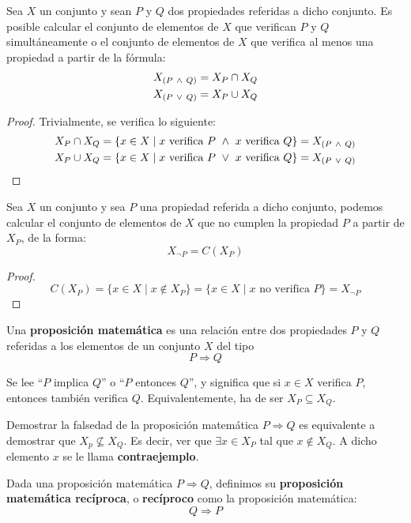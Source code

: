 \begin{prop}
    Sea $X$ un conjunto y sean $P$ y $Q$ dos propiedades referidas a dicho conjunto. Es posible calcular el conjunto de elementos de $X$ que verifican $P$ y $Q$ simultáneamente o el conjunto de elementos de $X$ que verifica al menos una propiedad a partir de la fórmula:
    \begin{gather*}
        X_{(P \ \land \  Q)} = X_P \cap X_Q \\
        X_{(P \ \lor \  Q)} = X_P \cup X_Q
    \end{gather*}
\end{prop}
\begin{proof} Trivialmente, se verifica lo siguiente:
    \begin{gather*}
        X_P \cap X_Q = \{x \in X \mid x \mbox{ verifica } P \ \land \  x \mbox{ verifica } Q\} = X_{(P \ \land \  Q)} \\
        X_P \cup X_Q = \{x \in X \mid x \mbox{ verifica } P \ \lor \  x \mbox{ verifica } Q\} = X_{(P \ \lor \  Q)}
    \end{gather*}
\end{proof}

\begin{prop}
    Sea $X$ un conjunto y sea $P$ una propiedad referida a dicho conjunto, podemos calcular el conjunto de elementos de $X$ que no cumplen la propiedad $P$ a partir de $X_P$, de la forma:
    $$X_{\lnot P} = C(X_P)$$
\end{prop}
\begin{proof}
    $$C(X_P) = \{x \in X \mid x \notin X_P \} = \{x \in X \mid x \mbox{ no verifica } P\} = X_{\lnot P}$$
\end{proof}

\begin{definicion}
    Una \textbf{proposición matemática} es una relación entre dos propiedades $P$ y $Q$ referidas a los elementos de un conjunto $X$ del tipo $$P \Longrightarrow Q$$
    
    Se lee ``$P$ implica $Q$'' o ``$P$ entonces $Q$'', y significa que si $x\in X$ verifica $P$, entonces también verifica $Q$. Equivalentemente, ha de ser $X_P\subseteq X_Q$.
\end{definicion}

Demostrar la falsedad de la proposición matemática $P \Longrightarrow Q$ es equivalente a demostrar que $X_p\not \subseteq X_Q$. Es decir, ver que $\exists x\in X_P$ tal que $x\notin X_Q$. A dicho elemento $x$ se le llama \textbf{contraejemplo}.

\begin{definicion}[Recíproco]
    Dada una proposición matemática $P\Longrightarrow Q$, definimos su \textbf{proposición matemática recíproca}, o \textbf{recíproco} como la proposición matemática:
    \begin{equation*}
        Q\Longrightarrow P
    \end{equation*}
\end{definicion}

